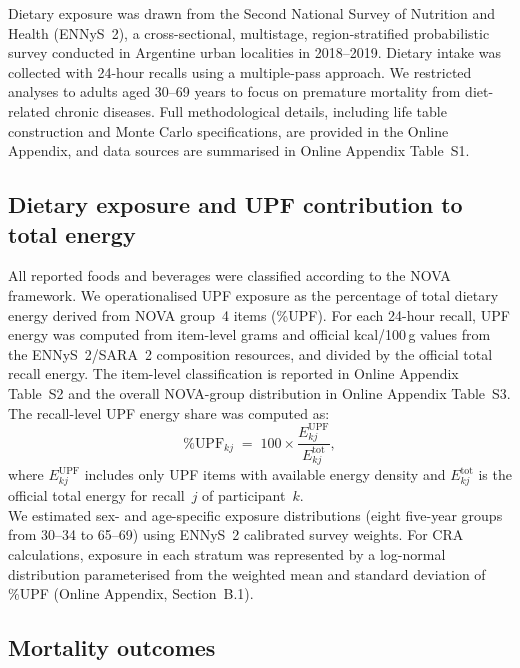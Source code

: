 \documentclass{article}
\begin{document}
Dietary exposure was drawn from the Second National Survey of Nutrition and Health (ENNyS~2), a cross-sectional, multistage, region-stratified probabilistic survey conducted in Argentine urban localities in 2018--2019.\cite{ENNYS22019,ENNYS2Dataset} Dietary intake was collected with 24-hour recalls using a multiple-pass approach.\cite{ENNYS22019} We restricted analyses to adults aged 30--69 years to focus on premature mortality from diet-related chronic diseases. Full methodological details, including life table construction and Monte Carlo specifications, are provided in the Online Appendix, and data sources are summarised in Online Appendix Table~S1.

\subsection{Dietary exposure and UPF contribution to total energy}

All reported foods and beverages were classified according to the NOVA framework.\cite{Monteiro2019UPFIdentify} We operationalised UPF exposure as the percentage of total dietary energy derived from NOVA group~4 items (\%UPF). For each 24-hour recall, UPF energy was computed from item-level grams and official kcal/100\,g values from the ENNyS~2/SARA~2 composition resources,\cite{SARA22022} and divided by the official total recall energy. The item-level classification is reported in Online Appendix Table~S2 and the overall NOVA-group distribution in Online Appendix Table~S3. The recall-level UPF energy share was computed as:
%
\begin{equation}
\%\text{UPF}_{kj} \;=\; 100 \times \frac{E^{\text{UPF}}_{kj}}{E^{\text{tot}}_{kj}},
\end{equation}
%
where $E^{\text{UPF}}_{kj}$ includes only UPF items with available energy density and $E^{\text{tot}}_{kj}$ is the official total energy for recall~$j$ of participant~$k$. \\

We estimated sex- and age-specific exposure distributions (eight five-year groups from 30--34 to 65--69) using ENNyS~2 calibrated survey weights. For CRA calculations, exposure in each stratum was represented by a log-normal distribution parameterised from the weighted mean and standard deviation of \%UPF (Online Appendix, Section~B.1).

\subsection{Mortality outcomes}
\end{document}
